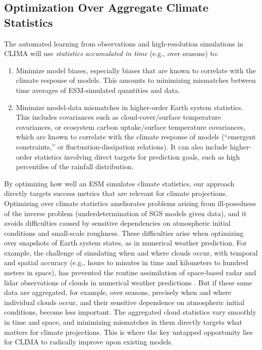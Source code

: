 \documentclass{article}
\begin{document}
\subsection{Optimization Over Aggregate Climate Statistics}

The automated learning from observations and high-resolution simulations in CLIMA will use \emph{statistics accumulated in time} (e.g., over seasons) to:
\begin{enumerate}
\item Minimize model biases, especially biases that are known to correlate with the climate response of models. This amounts to minimizing mismatches between time averages of ESM-simulated quantities and data.
\item Minimize model-data mismatches in higher-order Earth system statistics. This includes covariances such as cloud-cover/surface temperature covariances, or ecosystem carbon uptake/surface temperature covariances, which are known to correlate with the climate response of models (``emergent constraints,'' or fluctuation-dissipation relations). It can also include higher-order statistics involving direct targets for prediction goals, such as high percentiles of the rainfall distribution. 
\end{enumerate}
By optimizing how well an ESM simulates climate statistics, our approach directly targets success metrics that are relevant for climate projections. Optimizing over climate statistics ameliorates problems arising from ill-posedness of the inverse problem (underdetermination of SGS models given data), and it  avoids difficulties caused by sensitive dependencies on atmospheric initial conditions and small-scale roughness. These difficulties arise when optimizing over snapshots of Earth system states, as in numerical weather prediction. For example, the challenge of simulating when and where clouds occur, with temporal and spatial accuracy (e.g., hours to minutes in time and kilometers to hundred meters in space), has prevented the routine assimilation of space-based radar and lidar observations of clouds in numerical weather predictions \citep{Stephens18a}. But if these same data are aggregated, for example, over seasons, precisely when and where individual clouds occur, and their sensitive dependence on atmospheric initial conditions, become less important. The aggregated cloud statistics vary smoothly in time and space, and minimizing mismatches in them directly targets what matters for climate projections. This is where the key untapped opportunity lies for CLIMA to radically improve upon existing models.
\end{document}

